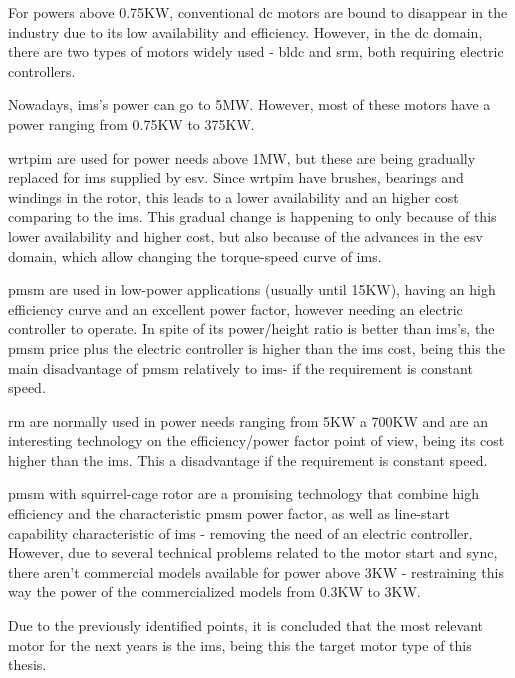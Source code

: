 For powers above 0.75KW, conventional \acrshort{dc} motors are bound to disappear in the industry due to its low availability and efficiency. However, in the \acrshort{dc} domain, there are two types of motors widely used - \acrfull{bldc} and \acrfull{srm}, both requiring electric controllers.

Nowadays, \acrshort{ims}'s power can go to 5MW. However, most of these motors have a power ranging from 0.75KW to 375KW. 

\acrshort{wrtpim} are used for power needs above 1MW, but these are being gradually replaced for \acrshort{ims} supplied by \acrfull{esv}. Since \acrshort{wrtpim} have brushes, bearings and windings in the rotor, this leads to a lower availability and an higher cost comparing to the \acrshort{ims}. This gradual change is happening to only because of this lower availability and higher cost, but also because of the advances in the  \acrfull{esv} domain, which allow changing the torque-speed curve of \acrshort{ims}.

\acrshort{pmsm} are used in low-power applications (usually until 15KW), having an high efficiency curve and an excellent power factor, however needing an electric controller to operate. In spite of its power/height ratio is better than \acrshort{ims}'s, the \acrshort{pmsm} price plus the electric controller is higher than the \acrshort{ims} cost, being this the main disadvantage of \acrshort{pmsm} relatively to \acrshort{ims}- if the requirement is constant speed.

\acrshort{rm} are normally used in power needs ranging from 5KW a 700KW and are an interesting technology on the efficiency/power factor point of view, being its cost higher than the \acrshort{ims}. This a disadvantage if the requirement is constant speed.

\acrshort{pmsm} with squirrel-cage rotor are a promising technology that combine high efficiency and the characteristic \acrshort{pmsm} power factor, as well as line-start capability characteristic of \acrshort{ims} - removing the need of an electric controller.
However, due to several technical problems related to the motor start and sync, there aren't commercial models available for power above 3KW - restraining this way the power of the commercialized models from 0.3KW to 3KW.

Due to the previously identified points, it is concluded that the most relevant motor for the next years is the \acrshort{ims}, being this the target motor type of this thesis.

